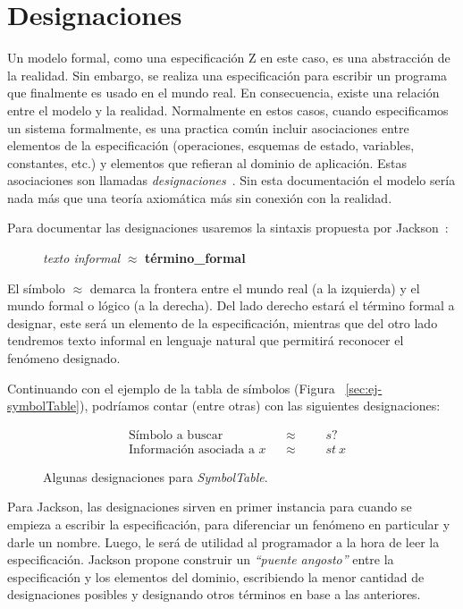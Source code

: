 \chapter{Designaciones}
\label{cap:designaciones}

Un modelo formal, como una especificación Z en este caso, es una abstracción de la realidad. Sin embargo, se realiza una especificación para escribir un programa que finalmente es usado en el mundo real. En consecuencia, existe una relación entre el modelo y la realidad.
Normalmente en estos casos, cuando especificamos un sistema formalmente, es una practica común incluir asociaciones entre elementos de la especificación (operaciones, esquemas de estado, variables, constantes, etc.) y elementos que refieran al dominio de aplicación. Estas asociaciones son llamadas \emph{designaciones}~\cite{jackson}.
Sin esta documentación el modelo sería nada más que una teoría axiomática más sin conexión con la realidad. 

Para documentar las designaciones usaremos la sintaxis propuesta por Jackson~\cite{jackson}:

\begin{figure}[H]
  \centering
  \emph{texto informal} $\approx$ \textbf{término\_formal}
\end{figure}

El símbolo $\approx$ demarca la frontera entre el mundo real (a la izquierda) y el mundo formal o lógico (a la derecha). Del lado derecho estará el término formal a designar, este será un elemento de la especificación, mientras que del otro lado tendremos texto informal en lenguaje natural que permitirá reconocer el fenómeno designado.

Continuando con el ejemplo de la tabla de símbolos (Figura ~\ref{sec:ej-symbolTable}), podríamos contar (entre otras) con las siguientes designaciones:

\begin{figure}[H]
  \begin{align*} 
    &\text{Símbolo a buscar} && \approx &&&s? \\
    &\text{Información asociada a $x$} && \approx &&&st~x
  \end{align*}
  \caption{Algunas designaciones para \emph{SymbolTable}.}
  \label{fig:ej_designacion}
\end{figure}


Para Jackson, las designaciones sirven en primer instancia para cuando se empieza a escribir la especificación, para diferenciar un fenómeno en particular y darle un nombre. Luego, le será de utilidad al programador a la hora de leer la especificación. Jackson propone construir un \emph{``puente angosto''} entre la especificación y los elementos del dominio, escribiendo la menor cantidad de designaciones posibles y designando otros términos en base a las anteriores.


